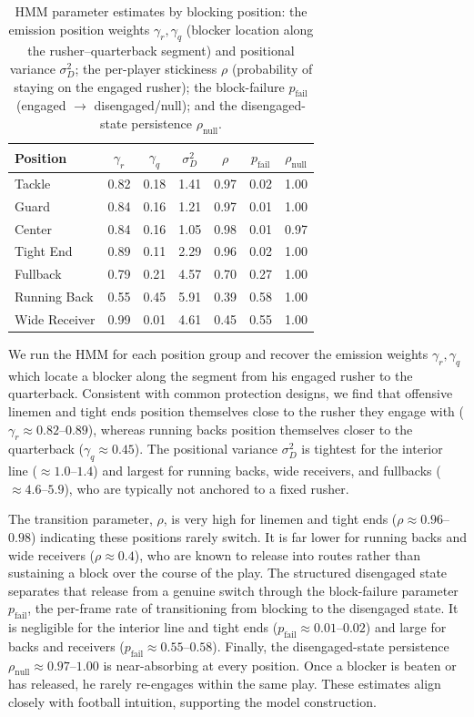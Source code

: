 \documentclass[USenglish]{article}
\theoremstyle{dgthm}
\theoremstyle{dgdef}
\begin{document}
\begin{table}[ht]
\centering
\footnotesize
\begin{tabular}{|l|c|c|c|c|c|c|}
\hline
Position & $\gamma_r$ & $\gamma_q$ & $\sigma^2_{D}$ & $\rho$ & $p_{\text{fail}}$ & $\rho_{\text{null}}$ \\
\hline
Tackle        & 0.82 & 0.18 & 1.41 & 0.97 & 0.02 & 1.00 \\
Guard         & 0.84 & 0.16 & 1.21 & 0.97 & 0.01 & 1.00 \\
Center        & 0.84 & 0.16 & 1.05 & 0.98 & 0.01 & 0.97 \\
Tight End     & 0.89 & 0.11 & 2.29 & 0.96 & 0.02 & 1.00 \\
Fullback      & 0.79 & 0.21 & 4.57 & 0.70 & 0.27 & 1.00 \\
Running Back  & 0.55 & 0.45 & 5.91 & 0.39 & 0.58 & 1.00 \\
Wide Receiver & 0.99 & 0.01 & 4.61 & 0.45 & 0.55 & 1.00 \\
\hline
\end{tabular}
\caption{HMM parameter estimates by blocking position: the emission position weights $\gamma_r,\gamma_q$ (blocker location along the rusher--quarterback segment) and positional variance $\sigma^2_{D}$; the per-player stickiness $\rho$ (probability of staying on the engaged rusher); the block-failure  $p_{\text{fail}}$ (engaged $\to$ disengaged/null); and the disengaged-state persistence $\rho_{\text{null}}$.}
\label{tab:hmm_estimate}
\end{table}

We run the HMM for each position group and recover the emission weights $\gamma_r,\gamma_q$ which locate a blocker along the segment from his engaged rusher to the quarterback. Consistent with common protection designs, we find that offensive linemen and tight ends position themselves close to the rusher they engage with ($\gamma_r \approx 0.82$--$0.89$), whereas running backs position themselves closer to the quarterback ($\gamma_q \approx 0.45$). The positional variance $\sigma^2_{D}$ is tightest for the interior line ($\approx 1.0$--$1.4$) and largest for running backs, wide receivers, and fullbacks ($\approx 4.6$--$5.9$), who are typically not anchored to a fixed rusher.

The transition parameter, $\rho$,  is very high for linemen and tight ends ($\rho \approx 0.96$--$0.98$) indicating these positions rarely switch. It is far lower for running backs and wide receivers ($\rho \approx 0.4$), who are known to release into routes rather than sustaining a block over the course of the play. The structured disengaged state separates that release from a genuine switch through the block-failure parameter $p_{\text{fail}}$, the per-frame rate of transitioning from blocking to the disengaged state. It is negligible for the interior line and tight ends ($p_{\text{fail}} \approx 0.01$--$0.02$) and large for backs and receivers ($p_{\text{fail}} \approx 0.55$--$0.58$). Finally, the disengaged-state persistence $\rho_{\text{null}} \approx 0.97$--$1.00$ is near-absorbing at every position. Once a blocker is beaten or has released, he rarely re-engages within the same play. These estimates align closely with football intuition, supporting the model construction.
\end{document}
